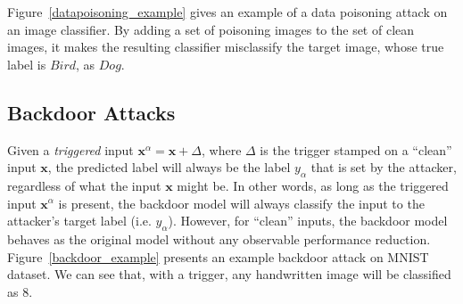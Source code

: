 Figure~\ref{datapoisoning_example} gives an example of a data poisoning attack on an image classifier. By adding a set of poisoning images to the set of clean images, it makes the resulting classifier misclassify the target image, whose true label is $Bird$, as $Dog$.


\subsection*{Backdoor Attacks}\label{sec:backdoordefinition}


Given a \textit{triggered} input $\textbf{x}^{\alpha} = \textbf{x} + \Delta$, where $\Delta$ is the trigger stamped on a ``clean'' input $\textbf{x}$, the predicted label will always be the label $y_{\alpha}$ that is set by the attacker, regardless of what the input $\textbf{x}$ might be. In other words, as long as the triggered input $\textbf{x}^{\alpha}$ is present, the backdoor model will always classify the input to the attacker's target label (i.e. $y_{\alpha}$). However, for ``clean'' inputs, the backdoor model behaves as the original model without any observable performance reduction. 
%
Figure~\ref{backdoor_example} presents an example backdoor attack on MNIST dataset. We can see that, with a trigger, any handwritten image will be classified as 8. 

